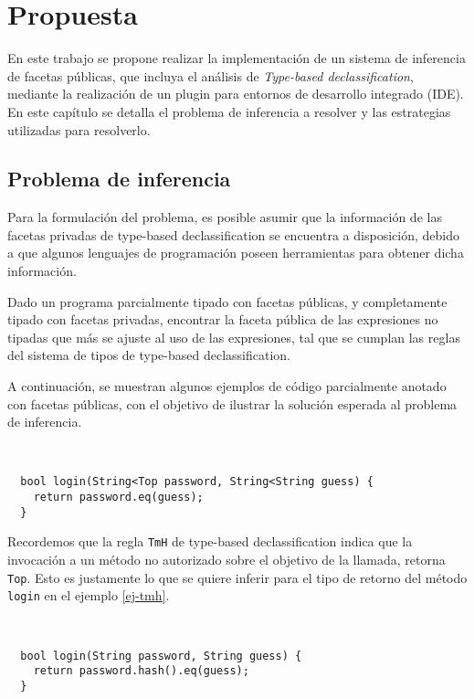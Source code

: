 \chapter{Propuesta}

En este trabajo se propone realizar la implementación de un sistema de inferencia de facetas públicas, que incluya el análisis de \textit{Type-based declassification}, mediante la realización de un plugin para entornos de desarrollo integrado (IDE). En este capítulo se detalla el problema de inferencia a resolver y las estrategias utilizadas para resolverlo.

\section{Problema de inferencia}
Para la formulación del problema, es posible asumir que la información de las facetas privadas de type-based declassification se encuentra a disposición, debido a que algunos lenguajes de programación poseen herramientas para obtener dicha información.

\begin{defn}
  Dado un programa parcialmente tipado con facetas públicas, y completamente tipado con facetas privadas, encontrar la faceta pública de las expresiones no tipadas que más se ajuste al uso de las expresiones, tal que se cumplan las reglas del sistema de tipos de type-based declassification.
\end{defn}

A continuación, se muestran algunos ejemplos de código parcialmente anotado con facetas públicas, con el objetivo de ilustrar la solución esperada al problema de inferencia.

\begin{ej} \ \\
  \label{ej-tmh}
  \normalfont
\begin{lstlisting}
  bool login(String<Top password, String<String guess) {
    return password.eq(guess);
  }
\end{lstlisting}
\end{ej}

Recordemos que la regla \texttt{TmH} de type-based declassification indica que la invocación a un método no autorizado sobre el objetivo de la llamada, retorna \texttt{Top}. Esto es justamente lo que se quiere inferir para el tipo de retorno del método \texttt{login} en el ejemplo \ref{ej-tmh}.

\begin{ej} \ \\
  \label{ej-tmd}
  \normalfont
\begin{lstlisting}
  bool login(String password, String guess) {
    return password.hash().eq(guess);
  }
\end{lstlisting}
\end{ej}

